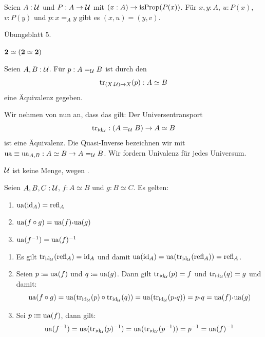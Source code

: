\begin{lemma}
  Seien $A:\mathcal{U}$ und $P:A\to\mathcal{U}$ mit $(x:A)\to \mathrm{isProp}(P(x))$.
  Für $x,y:A$, $u:P(x)$, $v:P(y)$ und $p:x=_A y$ gibt es $(x,u)=(y,v)$.
\end{lemma}

\begin{beweis}
  Übungsblatt 5.
\end{beweis}

\begin{beispiel}
  \label{automorphismen-zwei}
$\mathbf{2}\simeq (\mathbf{2}\simeq\mathbf{2})$  
\end{beispiel}

\begin{definition}
  Seien $A,B:\mathcal{U}$. Für $p:A=_{\mathcal{U}} B$ ist durch den 
  \[
    \mathrm{tr}_{(X:\mathcal{U})\mapsto X}(p):A\simeq B
  \]
  eine Äquivalenz gegeben.
\end{definition}

\begin{axiom}
  Wir nehmen von nun an, dass das  gilt: Der Universentransport
  \[
     \mathrm{tr}_{\mathrm{id}_{\mathcal{U}}}:(A=_{\mathcal{U}}B)\to A\simeq B
     \]
     ist eine Äquivalenz. Die Quasi-Inverse bezeichnen wir mit $\mathrm{ua}\equiv \mathrm{ua}_{A,B}:A\simeq B\to A=_{\mathcal{U}} B$\index{$\ua$}.
     Wir fordern Univalenz für jedes Universum.
\end{axiom}

\begin{bemerkung}
  $\mathcal{U}$ ist keine Menge, wegen .
\end{bemerkung}

\begin{lemma}
  Seien $A,B,C:\mathcal{U}$, $f:A\simeq B$ und $g:B\simeq C$. Es gelten:
  \begin{enumerate}
  \item $\mathrm{ua}(\mathrm{id}_A)=\mathrm{refl}_A$
  \item $\ua(f\circ g)=\ua(f)\kon \ua(g)$
  \item $\mathrm{ua}(f^{-1})=\mathrm{ua}(f)^{-1}$
  \end{enumerate}
\end{lemma}

\begin{beweis}
  \begin{enumerate}
  \item Es gilt $\mathrm{tr}_{\mathrm{id}_{\mathcal{U}}}(\mathrm{refl}_A)=\mathrm{id}_A$ und damit $\mathrm{ua}(\mathrm{id}_A)=\mathrm{ua}(\mathrm{tr}_{\mathrm{id}_{\mathcal{U}}}(\mathrm{refl}_A))=\mathrm{refl}_A$.
  \item Seien $p\vcentcolon\mspace{-1.2mu}\equiv\mathrm{ua}(f)$ und $q\vcentcolon\mspace{-1.2mu}\equiv\mathrm{ua}(g)$. Dann gilt $\mathrm{tr}_{\mathrm{id}_{\mathcal{U}}}(p)=f$ und $\mathrm{tr}_{\mathrm{id}_{\mathcal{U}}}(q)=g$ und damit:
    \[
      \ua(f\circ g)=\ua(\transp_{\id_\mU}(p)\circ \transp_{\id_\mU}(q))=\ua(\transp_{\id_\mU}(p\kon q))=p\kon q=\ua(f)\kon\ua(g)
    \]
  \item Sei $p\vcentcolon\mspace{-1.2mu}\equiv\mathrm{ua}(f)$, dann gilt:
    \[
      \mathrm{ua}(f^{-1})=\mathrm{ua}(\mathrm{tr}_{\mathrm{id}_{\mathcal{U}}}(p)^{-1})=\mathrm{ua}(\mathrm{tr}_{\mathrm{id}_{\mathcal{U}}}(p^{-1}))=p^{-1}=\mathrm{ua}(f)^{-1}
    \]
  \end{enumerate}
\end{beweis}

